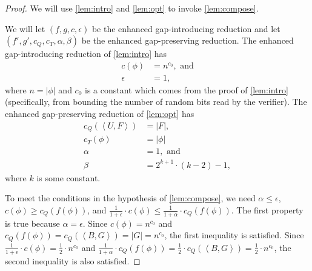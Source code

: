 \documentclass[]{article}
\newcommand{\pair}[2]{{\left\langle{#1}, {#2}\right\rangle}}
\begin{document}
\begin{proof}
  We will use \autoref{lem:intro} and \autoref{lem:opt} to invoke \autoref{lem:compose}.

  We will let $(f, g, c, \epsilon)$ be the \NC{} enhanced gap-introducing reduction and let $(f', g', c_Q, c_T, \alpha, \beta)$ be the \NC{} enhanced gap-preserving reduction.
  The enhanced gap-introducing reduction of \autoref{lem:intro} has
  \begin{align*}
    c(\phi) & = n^{c_0}, \text{ and} \\
    \epsilon & = 1,
  \end{align*}
  where $n = |\phi|$ and $c_0$ is a constant which comes from the proof of \autoref{lem:intro} (specifically, from bounding the number of random bits read by the verifier).
  The enhanced gap-preserving reduction of \autoref{lem:opt} has
  \begin{align*}
    c_Q(\pair{U}{F}) & = |F|, \\
    c_T(\phi) & = |\phi| \\
    \alpha & = 1, \text{ and} \\
    \beta & = 2^{k + 1} \cdot (k - 2) - 1,
  \end{align*}
  where $k$ is some constant.

  To meet the conditions in the hypothesis of \autoref{lem:compose}, we need $\alpha \leq \epsilon$, $c(\phi) \geq c_Q(f(\phi))$, and $\frac{1}{1 + \epsilon} \cdot c(\phi) \leq \frac{1}{1 + \alpha} \cdot c_Q(f(\phi))$.
  The first property is true because $\alpha = \epsilon$.
  Since $c(\phi) = n^{c_0}$ and $c_Q(f(\phi)) = c_Q(\pair{B}{G}) = |G| = n^{c_0}$, the first inequality is satisfied.
  Since $\frac{1}{1 + \epsilon} \cdot c(\phi) = \frac{1}{2} \cdot n^{c_0}$ and $\frac{1}{1 + \alpha} \cdot c_Q(f(\phi)) = \frac{1}{2} \cdot c_Q(\pair{B}{G}) = \frac{1}{2} \cdot n^{c_0}$, the second inequality is also satisfied.


\end{proof}
\end{document}
